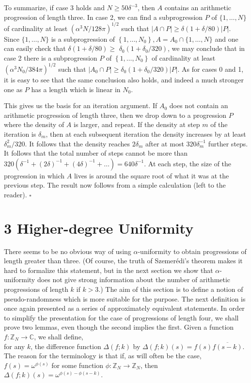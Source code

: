 \documentclass[10pt]{article}
\begin{document}
To summarize, if case 3 holds and $N \geqslant 50 \delta^{-3}$, then $A$ contains an arithmetic progression of length three. In case 2, we can find a subprogression $P$ of $\{1, \ldots, N\}$ of cardinality at least $\left(\alpha^{3} N / 128 \pi\right)^{1 / 2}$ such that $|A \cap P| \geqslant \delta(1+\delta / 80)|P|$. Since $\{1, \ldots, N\}$ is a subprogression of $\left\{1, \ldots, N_{0}\right\}, A=A_{0} \cap\{1, \ldots, N\}$ and one can easily check that $\delta(1+\delta / 80) \geqslant$ $\delta_{0}\left(1+\delta_{0} / 320\right)$, we may conclude that in case 2 there is a subprogression $P$ of $\left\{1, \ldots, N_{0}\right\}$ of cardinality at least $\left(\alpha^{3} N_{0} / 384 \pi\right)^{1 / 2}$ such that $\left|A_{0} \cap P\right| \geqslant \delta_{0}\left(1+\delta_{0} / 320\right)|P|$. As for cases 0 and 1, it is easy to see that the same conclusion also holds, and indeed a much stronger one as $P$ has a length which is linear in $N_{0}$.

This gives us the basis for an iteration argument. If $A_{0}$ does not contain an arithmetic progression of length three, then we drop down to a progression $P$ where the density of $A$ is larger, and repeat. If the density at step $m$ of the iteration is $\delta_{m}$, then at each subsequent iteration the density increases by at least $\delta_{m}^{2} / 320$. It follows that the density reaches $2 \delta_{m}$ after at most $320 \delta_{m}^{-1}$ further steps. It follows that the total number of steps cannot be more than $320\left(\delta^{-1}+(2 \delta)^{-1}+(4 \delta)^{-1}+\ldots\right)=640 \delta^{-1}$. At each step, the size of the progression in which $A$ lives is around the square root of what it was at the previous step. The result now follows from a simple calculation (left to the reader). \(\square\)

\section*{3 Higher-degree Uniformity}
There seems to be no obvious way of using $\alpha$-uniformity to obtain progressions of length greater than three. (Of course, the truth of Szemerédi's theorem makes it hard to formalize this statement, but in the next section we show that $\alpha$-uniformity does not give strong information about the number of arithmetic progressions of length $k$ if $k>3$.) The aim of this section is to define a notion of pseudo-randomness which is more suitable for the purpose. The next definition is once again presented as a series of approximately equivalent statements. In order to simplify the presentation for the case of progressions of length four, we shall prove two lemmas, even though the second implies the first. Given a function $f: \mathbb{Z}_{N} \rightarrow \mathbb{C}$, we shall define,\\
for any $k$, the difference function $\Delta(f ; k)$ by $\Delta(f ; k)(s)=f(s) \overline{f(s-k)}$. The reason for the terminology is that if, as will often be the case, $f(s)=\omega^{\phi(s)}$ for some function $\phi: \mathbb{Z}_{N} \rightarrow \mathbb{Z}_{N}$, then $\Delta(f ; k)(s)=\omega^{\phi(s)-\phi(s-k)}$.
\end{document}
